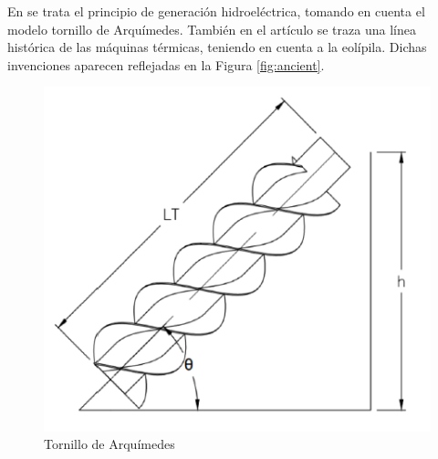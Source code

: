 En \cite{cuenca2023diseno} se trata el principio de generación hidroeléctrica, tomando en cuenta el modelo tornillo de Arquímedes. También en el artículo \cite{giri2020maquinas} se traza una línea histórica de las máquinas térmicas, teniendo en cuenta a la eolípila. Dichas invenciones aparecen reflejadas en la Figura \ref{fig:ancient}.

\begin{figure}[ht!]
	\centering
	\begin{minipage}{0.3\linewidth}
		\centering
		\includegraphics[width=\linewidth]{figs/arquimedes.png}
		\caption*{\centering Tornillo de Arquímedes} 
	\end{minipage}
	\hspace{3cm}
	\begin{minipage}{0.3\linewidth}
		\centering

\end{minipage}
\end{figure}
